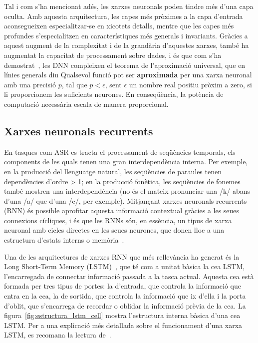 Tal i com s'ha mencionat adés, les xarxes neuronals poden tindre més d'una capa oculta. 
Amb aquesta arquitectura, les capes més pròximes a la capa d'entrada aconsegueixen especialitzar-se en xicotets detalls, mentre que les capes més profundes s'especialitzen en característiques més generals i invariants. 
Gràcies a aquest augment de la complexitat i de la grandària d'aquestes xarxes, també ha augmentat la capacitat de processament sobre dades, i és que com s'ha demostrat~\cite{HORNIK1989359}, les DNN compleixen el teorema de l'aproximació universal, que en línies generals diu \guillemotleft Qualsevol funció pot ser \textbf{aproximada} per una xarxa neuronal amb una precisió $p$, tal que  $p < \epsilon$, sent $\epsilon$ un nombre real positiu pròxim a zero, si li proporcionem les suficients neurones\guillemotright. 
En conseqüència, la potència de computació necessària escala de manera proporcional.

\subsection{Xarxes neuronals recurrents}
En tasques com ASR es tracta el processament de seqüències temporals, els components de les quals tenen una gran interdependència interna.
Per exemple, en la producció del llenguatge natural, les seqüències de paraules tenen dependències d'ordre > 1; en la producció fonètica, les seqüències de fonemes també mostren una interdependència (no és el mateix pronunciar una /k/ abans d'una /a/ que d'una /e/, per exemple).
Mitjançant xarxes neuronals recurrents (RNN) és possible aprofitar aquesta informació contextual gràcies a les seues connexions cícliques, i és que les RNNs són, en essència, un tipus de xarxa neuronal amb cicles directes en les seues neurones, que donen lloc a una estructura d'estats interns o memòria~\cite{Yu2015AutomaticSR}.

Una de les arquitectures de xarxes RNN que més rellevància ha generat és la Long Short-Term Memory (LSTM)~\cite{hochreiter1997lstm}, que té com a unitat bàsica la ce\lgem a LSTM, l'encarregada de connectar informació passada a la tasca actual. Aquesta ce\lgem a està formada per tres tipus de portes: la d'entrada, que controla la informació que entra en la ce\lgem a, la de sortida, que controla la informació que ix d'ella i la porta d'oblit, que s'encarrega de recordar o oblidar la informació prèvia de la ce\lgem a. La figura~\ref{fig:estructura_lstm_cell} mostra l'estructura interna bàsica d'una ce\lgem a LSTM.
Per a una explicació més detallada sobre el funcionament d'una xarxa LSTM, es recomana la lectura de~\cite{colah2015lstm}.

